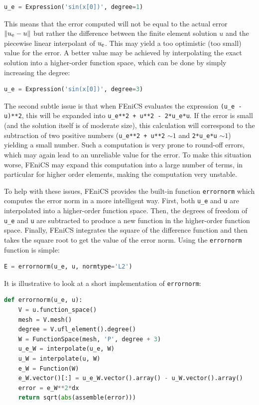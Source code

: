 \documentclass[graybox,envcountchap,sectrefs,final]{svmonodo}
\begin{document}
\begin{lstlisting}[language=Python,style=graycolor]
u_e = Expression('sin(x[0])', degree=1)
\end{lstlisting}
This means that the error computed will not be equal to the actual
error $\|\uex - u\|$ but rather the difference between the finite
element solution $u$ and the piecewise linear interpolant of
$\uex$. This may yield a too optimistic (too small) value for the
error. A better value may be achieved by interpolating the exact
solution into a higher-order function space, which can be done by
simply increasing the degree:

\begin{lstlisting}[language=Python,style=graycolor]
u_e = Expression('sin(x[0])', degree=3)
\end{lstlisting}

The second subtle issue is that when FEniCS evaluates the expression
\Verb!(u_e - u)**2!, this will be expanded into \Verb!u_e**2 + u**2 - 2*u_e*u!. If the error is small (and the solution itself is of
moderate size), this calculation will correspond to the subtraction of
two positive numbers (\Verb!u_e**2 + u**2! $\sim 1$ and \Verb!2*u_e*u! $\sim
1$) yielding a small number. Such a computation is very prone to
round-off errors, which may again lead to an unreliable value for the
error. To make this situation worse, FEniCS may expand this
computation into a large number of terms, in particular for higher
order elements, making the computation very unstable.

To help with these issues, FEniCS provides the built-in function
\texttt{errornorm} which computes the error norm in a more intelligent
way. First, both \Verb!u_e! and \texttt{u} are interpolated into a higher-order
function space. Then, the degrees of freedom of \Verb!u_e! and \texttt{u} are
subtracted to produce a new function in the higher-order function
space. Finally, FEniCS integrates the square of the difference
function and then takes the square root to get the value of the error
norm. Using the \texttt{errornorm} function is simple:

\begin{lstlisting}[language=Python,style=graycolor]
E = errornorm(u_e, u, normtype='L2')
\end{lstlisting}
It is illustrative to look at a short implementation of \texttt{errornorm}:

\begin{lstlisting}[language=Python,style=graycolor]
def errornorm(u_e, u):
    V = u.function_space()
    mesh = V.mesh()
    degree = V.ufl_element().degree()
    W = FunctionSpace(mesh, 'P', degree + 3)
    u_e_W = interpolate(u_e, W)
    u_W = interpolate(u, W)
    e_W = Function(W)
    e_W.vector()[:] = u_e_W.vector().array() - u_W.vector().array()
    error = e_W**2*dx
    return sqrt(abs(assemble(error)))
\end{lstlisting}
\end{document}
